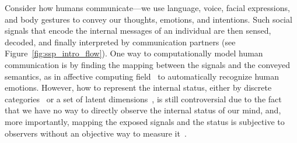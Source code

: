 

Consider how humans communicate---we use language, voice, facial expressions, and body gestures to convey our thoughts, emotions, and intentions. Such social signals that encode the internal messages of an individual are then sensed, decoded, and finally interpreted by communication partners (see  Figure~\ref{fig:ssp_intro_flow}). One way to computationally model human communication is by finding the mapping between the signals and the conveyed semantics, as in affective computing field~\cite{picard1997affective, picard2003affective,poria2017review} to automatically recognize human emotions. However, how to represent the internal status, either by discrete categories~\cite{ekman1969} or a set of latent dimensions~\cite{osgood1952nature, russell1979affective, plutchik2001nature}, is still controversial due to the fact that we have no way to directly observe the internal status of our mind, and, more importantly, mapping the exposed signals and the status is subjective to observers without an objective way to measure it~\cite{steidl2005all}. 

